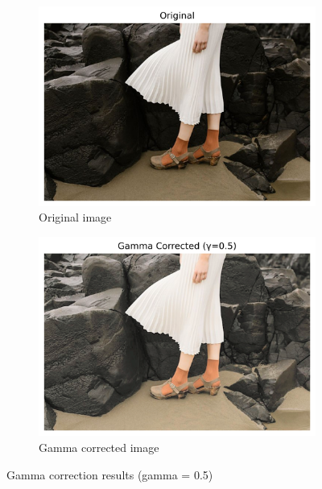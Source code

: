 \documentclass[10pt,a4paper]{article}
\begin{document}
\begin{figure}[H]
    \centering
    \begin{subfigure}{0.48\textwidth}
        \includegraphics[width=\textwidth]{task3/original_image.png}
        \caption{Original image}
    \end{subfigure}
    \begin{subfigure}{0.48\textwidth}
        \includegraphics[width=\textwidth]{task3/gamma_corrected_image.png}
        \caption{Gamma corrected image}
    \end{subfigure}
    \hfill
    \caption{Gamma correction results (gamma = 0.5)}
\end{figure}
\end{document}
